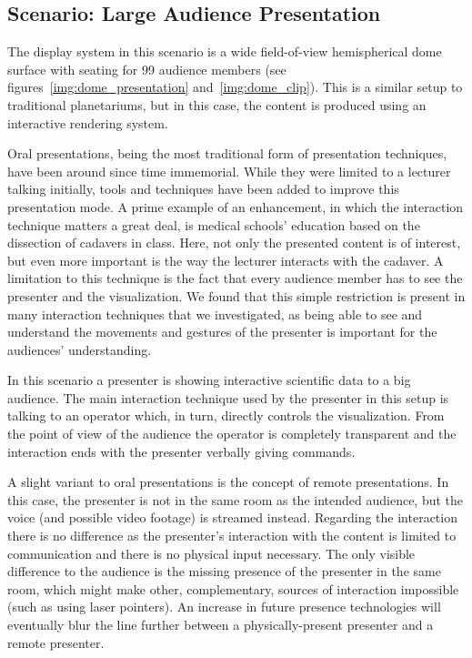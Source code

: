 \documentclass[review,journal]{vgtc}         %
\begin{document}
\subsection{Scenario: Large Audience Presentation} \label{sec:largeaudience}
The display system in this scenario is a wide field-of-view hemispherical dome surface with seating for 99 audience members (see figures~\ref{img:dome_presentation} and~\ref{img:dome_clip}).
This is a similar setup to traditional planetariums, but in this case, the content is produced using an interactive rendering system.

Oral presentations, being the most traditional form of presentation techniques, have been around since time immemorial.
While they were limited to a lecturer talking initially, tools and techniques have been added to improve this presentation mode.
A prime example of an enhancement, in which the interaction technique matters a great deal, is medical schools' education based on the dissection of cadavers in class.
Here, not only the presented content is of interest, but even more important is the way the lecturer interacts with the cadaver.
A limitation to this technique is the fact that every audience member has to see the presenter and the visualization.
We found that this simple restriction is present in many interaction techniques that we investigated, as being able to see and understand the movements and gestures of the presenter is important for the audiences' understanding.

In this scenario a presenter is showing interactive scientific data to a big audience.
The main interaction technique used by the presenter in this setup is talking to an operator which, in turn, directly controls the visualization.
From the point of view of the audience the operator is completely transparent and the interaction ends with the presenter verbally giving commands.

A slight variant to oral presentations is the concept of remote presentations.
In this case, the presenter is not in the same room as the intended audience, but the voice (and possible video footage) is streamed instead.
Regarding the interaction there is no difference as the presenter's interaction with the content is limited to communication and there is no physical input necessary.
The only visible difference to the audience is the missing presence of the presenter in the same room, which might make other, complementary, sources of interaction impossible (such as using laser pointers).
An increase in future presence technologies will eventually blur the line further between a physically-present presenter and a remote presenter.
\end{document}
